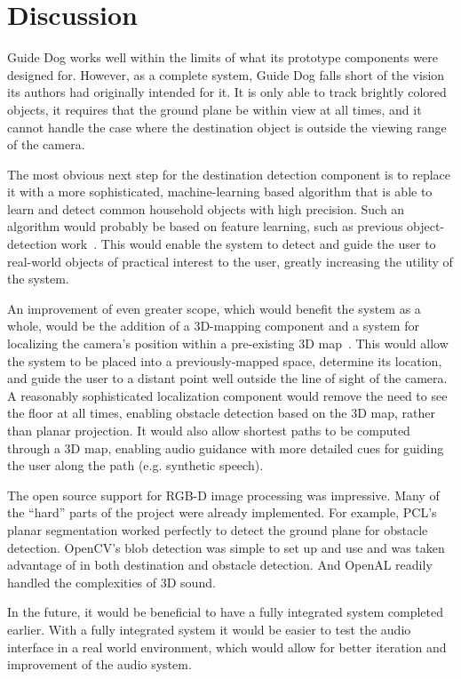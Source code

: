 \section{Discussion}
\label{sec:discussion}

Guide Dog works well within the limits of what its prototype components were
designed for. However, as a complete system, Guide Dog falls short of the vision
its authors had originally intended for it. It is only able to track brightly
colored objects, it requires that the ground plane be within view at all times,
and it cannot handle the case where the destination object is outside the
viewing range of the camera. 

The most obvious next step for the destination detection component is to replace
it with a more sophisticated, ma\-chine-learning based algorithm that is able to
learn and detect common household objects with high precision.  Such an
algorithm would probably be based on feature learning, such as previous
object-detection work~\cite{lai_icra12}.  This would enable the system to detect
and guide the user to real-world objects of practical interest to the user,
greatly increasing the utility of the system.

An improvement of even greater scope, which would benefit the system as a whole,
would be the addition of a 3D-mapping component and a system for localizing the
camera's position within a pre-existing 3D
map~\cite{Du:2011:IMI:2030112.2030123}. This would allow the system to be placed
into a previously-mapped space, determine its location, and guide the user to a
distant point well outside the line of sight of the camera. A reasonably
sophisticated localization component would remove the need to see the floor at
all times, enabling obstacle detection based on the 3D map, rather than planar
projection. It would also allow shortest paths to be computed through a 3D map,
enabling audio guidance with more detailed cues for guiding the user along the
path (e.g. synthetic speech).

The open source support for RGB-D image processing was impressive. Many of the
``hard'' parts of the project were already implemented. For example, PCL's
planar segmentation worked perfectly to detect the ground plane for obstacle
detection. OpenCV's blob detection was simple to set up and use and was taken
advantage of in both destination and obstacle detection. And OpenAL readily
handled the complexities of 3D sound.

In the future, it would be beneficial to have a fully integrated system
completed earlier. With a fully integrated system it would be easier to test the
audio interface in a real world environment, which would allow for better
iteration and improvement of the audio system.
